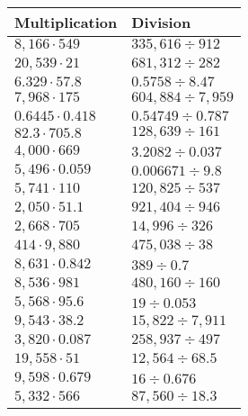 \begin{longtable}[]{@{}ll@{}}
\toprule
Multiplication & Division\tabularnewline
\midrule
\endhead
\(8,166\cdot549\) & \(335,616÷912\)\tabularnewline
\(20,539\cdot21\) & \(681,312÷282\)\tabularnewline
\(6.329\cdot57.8\) & \(0.5758 ÷8.47\)\tabularnewline
\(7,968\cdot175\) & \(604,884÷7,959\)\tabularnewline
\(0.6445\cdot0.418\) & \(0.54749÷0.787\)\tabularnewline
\(82.3\cdot705.8\) & \(128,639÷161\)\tabularnewline
\(4,000\cdot669\) & \(3.2082÷0.037\)\tabularnewline
\(5,496\cdot0.059\) & \(0.006671÷9.8\)\tabularnewline
\(5,741\cdot110\) & \(120,825÷537\)\tabularnewline
\(2,050\cdot51.1\) & \(921,404÷946\)\tabularnewline
\(2,668\cdot705\) & \(14,996÷326\)\tabularnewline
\(414\cdot9,880\) & \(475,038÷38\)\tabularnewline
\(8,631\cdot0.842\) & \(389÷0.7\)\tabularnewline
\(8,536\cdot981\) & \(480,160÷160\)\tabularnewline
\(5,568\cdot95.6\) & \(19÷0.053\)\tabularnewline
\(9,543\cdot38.2\) & \(15,822÷7,911\)\tabularnewline
\(3,820\cdot0.087\) & \(258,937÷497\)\tabularnewline
\(19,558\cdot51\) & \(12,564÷68.5\)\tabularnewline
\(9,598\cdot0.679\) & \(16÷0.676\)\tabularnewline
\(5,332\cdot566\) & \(87,560÷18.3\)\tabularnewline
\bottomrule
\end{longtable}
